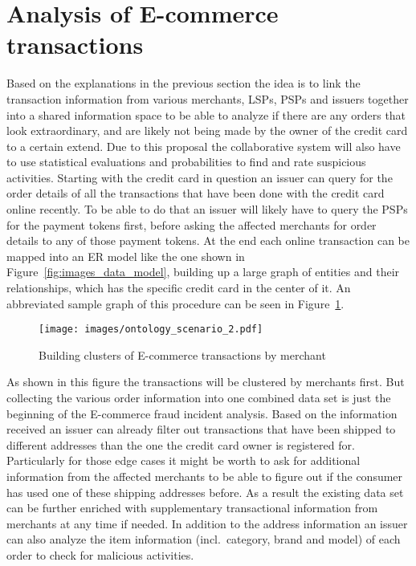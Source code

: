 
\section{Analysis of \gls{E-commerce} transactions}
\label{sec:analyze_transactions}

Based on the explanations in the previous section the idea is to link the transaction information from various merchants, \gls{LSP}s, \gls{PSP}s and issuers together into a shared information space to be able to analyze if there are any orders that look extraordinary, and are likely not being made by the owner of the credit card to a certain extend. Due to this proposal the collaborative system will also have to use statistical evaluations and probabilities to find and rate suspicious activities. Starting with the credit card in question an issuer can query for the order details of all the transactions that have been done with the credit card online recently. To be able to do that an issuer will likely have to query the \gls{PSP}s for the payment tokens first, before asking the affected merchants for order details to any of those payment tokens. At the end each online transaction can be mapped into an \gls{ER} model like the one shown in Figure~\ref{fig:images_data_model}, building up a large graph of entities and their relationships, which has the specific credit card in the center of it. An abbreviated sample graph of this procedure can be seen in Figure~\ref{fig:images_credit_card_graph}. \@

\begin{figure}[H]
  \centering
  \texttt{[image: images/ontology\_scenario\_2.pdf]}
  \caption{Building clusters of E-commerce transactions by merchant}
\label{fig:images_credit_card_graph}
\end{figure}

As shown in this figure the transactions will be clustered by merchants first. But collecting the various order information into one combined data set is just the beginning of the \gls{E-commerce} fraud incident analysis. Based on the information received an issuer can already filter out transactions that have been shipped to different addresses than the one the credit card owner is registered for. Particularly for those edge cases it might be worth to ask for additional information from the affected merchants to be able to figure out if the consumer has used one of these shipping addresses before. As a result the existing data set can be further enriched with supplementary transactional information from merchants at any time if needed. In addition to the address information an issuer can also analyze the item information (incl.\ category, brand and model) of each order to check for malicious activities. \\

